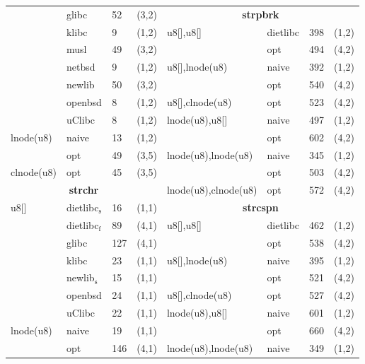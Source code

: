 \begin{figure}[H]
\begin{scriptsize}
\begin{tabular}{@{}l@{\hspace{5px}}l@{\hspace{5px}}l@{\hspace{5px}}cl@{\hspace{5px}}l@{\hspace{5px}}l@{\hspace{5px}}c@{}}
       & glibc & 52 & (3,2) &                                \multicolumn{4}{c}{\bf strpbrk} \\
       & klibc & 9 & (1,2) &                                 u8[],u8[] & dietlibc & 398 & (1,2) \\
       & musl & 49 & (3,2) &                                 & opt      & 494 & (4,2) \\
       & netbsd & 9 & (1,2) &                                u8[],lnode(u8) & naive & 392 & (1,2) \\
       & newlib & 50 & (3,2) &                               & opt & 540 & (4,2) \\
       & openbsd & 8 & (1,2) &                               u8[],clnode(u8) & opt & 523 & (4,2) \\
       & uClibc & 8 & (1,2) &                                lnode(u8),u8[] & naive & 497 & (1,2) \\
lnode(u8) & naive & 13 & (1,2) &                             & opt & 602 & (4,2) \\
            & opt & 49 & (3,5) &                             lnode(u8),lnode(u8) & naive & 345 & (1,2) \\
clnode(u8) & opt & 45 & (3,5) &                              & opt & 503 & (4,2) \\
 \multicolumn{4}{c}{\bf strchr} &                            lnode(u8),clnode(u8) & opt & 572 & (4,2) \\
u8[] & dietlibc$\mathrm{_{s}}$ & 16 & (1,1) &            \multicolumn{4}{c}{\bf strcspn} \\
       & dietlibc$\mathrm{_{f}}$ & 89 & (4,1) &           u8[],u8[] & dietlibc & 462 & (1,2) \\
       & glibc & 127 & (4,1) &                               & opt      & 538 & (4,2) \\
       & klibc & 23 & (1,1) &                                u8[],lnode(u8) & naive & 395 & (1,2) \\
       & newlib$\mathrm{_{s}}$ & 15 & (1,1) &            & opt & 521 & (4,2) \\
       & openbsd & 24 & (1,1) &                              u8[],clnode(u8) & opt & 527 & (4,2) \\
       & uClibc & 22 & (1,1) &                               lnode(u8),u8[] & naive & 601 & (1,2) \\
lnode(u8) & naive & 19 & (1,1) &                             & opt & 660 & (4,2) \\
            & opt & 146 & (4,1) &                            lnode(u8),lnode(u8) & naive & 349 & (1,2) \\

\end{tabular}
\end{scriptsize}
\end{figure}
